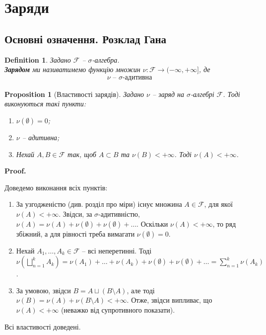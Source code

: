 \documentclass[a4paper, 10pt]{article}
\makeatletter
\theoremstyle{theoremdd}
\newtheorem{definition}[theorem]{Definition}
\newtheorem{proposition}[theorem]{Proposition}
\renewenvironment{proof}[1][Proof.\\]{\par
\pushQED{\hfill \qed}%
\normalfont \topsep6\p@\@plus6\p@\relax
\trivlist
\item\relax
{\bfseries
#1\@addpunct{.}}\hspace\labelsep\ignorespaces
}{%
\popQED\endtrivlist\@endpefalse
}
\makeatother
\begin{document}
\section{Заряди}
\subsection{Основні означення. Розклад Гана}
\begin{definition}
Задано $\mathcal{F}$ -- $\sigma$-алгебра.\\
\textbf{Зарядом} ми називатимемо функцію множин $\nu \colon \mathcal{F} \to (-\infty,+\infty]$, де
\begin{align*}
\nu \text{ -- $\sigma$-адитивна}
\end{align*}
\end{definition}

\begin{proposition}[Властивості зарядів]
Задано $\nu$ -- заряд на $\sigma$-алгебрі $\mathcal{F}$. Тоді виконуються такі пункти:
\begin{enumerate}[nosep,wide=0pt,label={\arabic*)}]
\item $\nu(\emptyset) = 0$;
\item $\nu$ -- адитивна;
\item Нехай $A,B \in \mathcal{F}$ так, щоб $A \subset B$ та $\nu(B) < +\infty$. Тоді $\nu(A) < +\infty$.
\end{enumerate}
\end{proposition}

\begin{proof}
Доведемо виконання всіх пунктів:
\begin{enumerate}[wide=0pt,label={\arabic*)}]
\item За узгодженістю (див. розділ про міри) існує множина $A \in \mathcal{F}$, для якої $\nu(A) < +\infty$. Звідси, за $\sigma$-адитивністю, $\nu(A) = \nu(A) + \nu(\emptyset) + \nu(\emptyset) + \dots$. Оскільки $\nu(A) < +\infty$, то ряд збіжний, а для рівності треба вимагати $\nu(\emptyset) = 0$.

\item Нехай $A_1,\dots,A_k \in \mathcal{F}$ -- всі неперетинні. Тоді \\ $\displaystyle\nu\left( \bigsqcup_{n=1}^k A_k \right) = \nu(A_1) + \dots + \nu(A_k) + \nu(\emptyset) + \nu(\emptyset) + \dots = \sum_{n=1}^k \nu(A_k)$.

\item За умовою, звідси $B = A \sqcup (B \setminus A)$, але тоді $\nu(B) = \nu(A) + \nu(B \setminus A) < +\infty$. Отже, звідси випливає, що $\nu(A) < +\infty$ (неважко від супротивного показати).
\end{enumerate}
Всі властивості доведені.
\end{proof}
\end{document}
